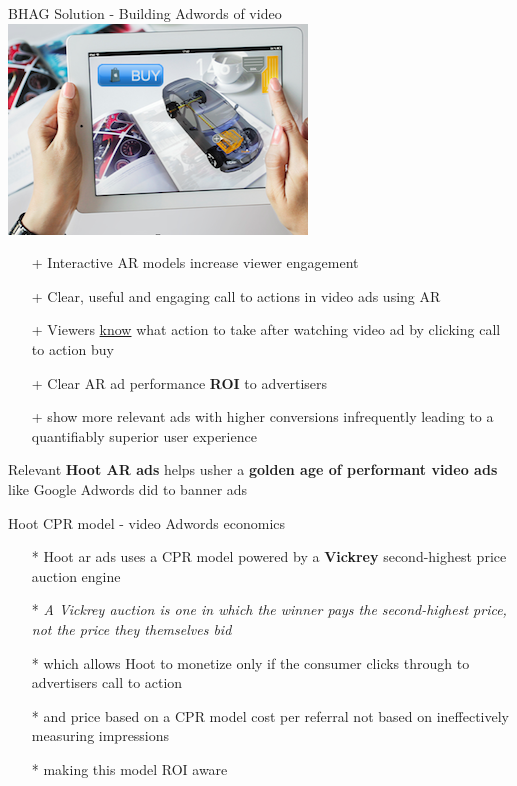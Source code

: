 \documentclass[12pt]{beamer}
\begin{document}
\begin{frame}[fragile]{BHAG Solution -  Building Adwords of video \includegraphics[scale=.1]{static/arad/arad5} }
\begin{itemize}
\item[+]Interactive AR models increase viewer engagement
\pause	
\item[+]Clear, useful and engaging call to actions in video ads using AR
\pause
\item[+]Viewers \underline{know} what action to take after watching video ad by clicking call to action buy 
\pause
\item[+]Clear AR ad performance \textbf{ROI} to advertisers 
\pause
\item[+]show more relevant ads with higher conversions infrequently leading to a quantifiably superior user experience 
\pause
\end{itemize}
Relevant \textbf{Hoot AR ads} helps usher a \textbf{golden age of performant video ads }like Google Adwords did to banner ads


\end{frame}

\begin{frame}[t]{Hoot CPR model - video Adwords economics}
\begin{itemize}
\item[*]Hoot ar ads uses a CPR model powered by a \textbf{Vickrey} second-highest price auction engine
\pause
\item[*]\emph{A Vickrey auction is one in which the winner pays the second-highest price, not the price they themselves bid}
\pause
\item[*]which allows Hoot to monetize only if the consumer clicks through to advertisers call to action
\pause
\item[*]and price based on a CPR model cost per referral not based on ineffectively measuring impressions
\item[*]making this model ROI aware
\end{itemize}
\end{frame}
\end{document}
